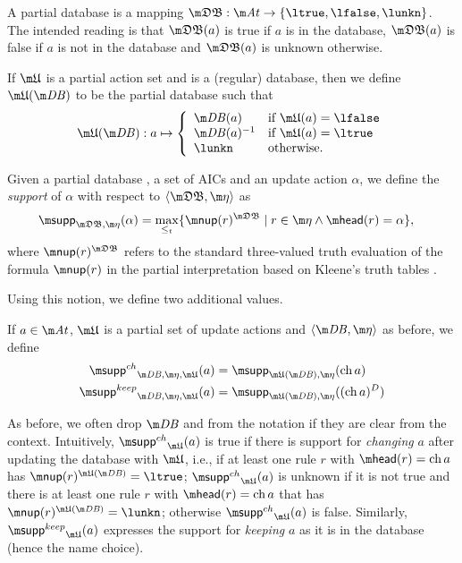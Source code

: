 A partial database is a mapping $\tdb: \atoms \to \{\ltrue,\lfalse,\lunkn\}$.
The intended reading is that $\tdb(a)$ is true if $a$ is in the database, $\tdb(a)$ is false if $a$ is not in the database and $\tdb(a)$ is unknown otherwise. 

If $\UUU$ is a partial action set and \db is a (regular) database, then we define $\UUU(\db)$ to be the partial database such that 
\[ \UUU(\db): a \mapsto \left \{\begin{array}{ll}
                                 \db(a) & \text{if }\UUU(a) = \lfalse\\
                                 \db(a)^{-1} & \text{if }\UUU(a) = \ltrue\\
                                 \lunkn & \text{otherwise.}
                                \end{array}\right.
                                \]



\begin{definition}\label{def:support}
Given a partial database \tdb, a set of AICs \aics and an update action $\alpha$,  we define the \emph{support} of $\alpha$ with respect to $\langle \tdb, \aics\rangle$ as 
\begin{align*}
 \supp_{\tdb,\aics}(\alpha) &= \max_{\leq_t}\{\nup(r)^{\tdb}\mid r\in \aics \land \head(r) = \alpha\},
\end{align*}
where $\nup(r)^{\tdb}$ refers to the standard three-valued truth evaluation of the formula $\nup(r)$ in the partial interpretation \tdb based on Kleene's truth tables \cite{Kleene38}.
\end{definition}

Using this notion, we define two additional values. 

\begin{definition}
If $a\in \atoms$, $\UUU$ is a partial set of update actions and $\langle \db, \aics\rangle$ as before, we define 
\begin{align*}
 \suppin_{\db,\aics,\UUU}(a) &= \supp_{\UUU(\db), \aics}(\change a)\\
  \suppout_{\db,\aics,\UUU}(a) &= \supp_{\UUU(\db), \aics}((\change a)^D)
\end{align*}
\end{definition}
As before, we often drop $\db$ and \aics from the notation if they are clear from the context. 
Intuitively, 
$\suppin_{\UUU}(a)$ is true if there is support for \emph{changing} $a$ after updating the database with $\UUU$, i.e., if at least one rule $r$ with $\head(r)=\change a$ has $\nup(r)^{\UUU(\db)} = \ltrue$;  
$\suppin_{\UUU}(a)$ is unknown if it is not true and there is at least one rule $r$ with $\head(r)=\change a$ that has $\nup(r)^{\UUU(\db)} = \lunkn$; 
otherwise $\suppin_{\UUU}(a)$ is false. 
Similarly, $\suppout_{\UUU}(a)$ expresses the support for \emph{keeping} $a$ as it is in the database (hence the name choice). 






